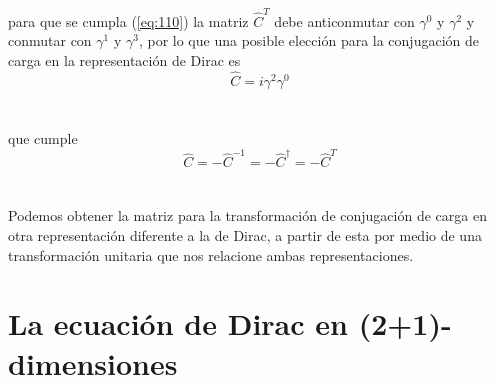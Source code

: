 \documentclass[11pt,letterpaper]{article}     %
\begin{document}
para que se cumpla (\ref{eq:110}) la matriz $\hat{C}^T$ debe anticonmutar con $\gamma^0$ y $\gamma^2$ y conmutar con  $\gamma^1$ y $\gamma^3$, por lo que una posible elección para la conjugación de carga en la representación de Dirac es
\begin{equation}\label{eq:113}
\hat{C}=i \gamma^2 \gamma^0 
\end{equation} \\ \\
que cumple
\begin{equation}\label{eq:114}
\hat{C}=- \hat{C}^{-1}=- \hat{C}^\dagger =- \hat{C}^T
\end{equation} \\ \\
Podemos obtener la matriz para la transformación de conjugación de carga en otra representación diferente a la de Dirac, a partir de esta por medio de una transformación unitaria que nos relacione ambas representaciones.
\newpage





\section{La ecuación de Dirac en (2+1)-dimensiones}
\end{document}
